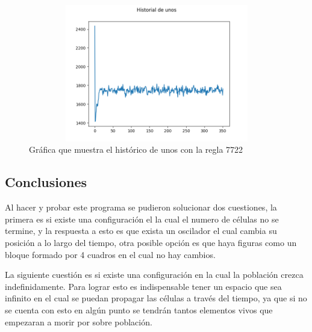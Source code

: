\begin{figure}[H]
\begin{center}
 \includegraphics[width=13cm, height=6cm]{./img/unos_777.png}
 \caption{Gráfica que muestra el histórico de unos con la regla 7722}
 \label{fig:grafica_unos}
\end{center}
\end{figure}

\subsection{Conclusiones}
Al hacer y probar este programa se pudieron solucionar dos cuestiones, la primera es si existe una configuración el la cual el numero de células no se termine, y la respuesta a esto es que exista un oscilador el cual cambia su posición a lo largo del tiempo, otra posible opción es que haya figuras como un bloque formado por 4 cuadros en el cual no hay cambios.

La siguiente cuestión es si existe una configuración en la cual la población crezca indefinidamente. Para lograr esto es indispensable tener un espacio que sea infinito en el cual se puedan propagar las células a través del tiempo, ya que si no se cuenta con esto en algún punto se tendrán tantos elementos vivos que empezaran a morir por sobre población.
